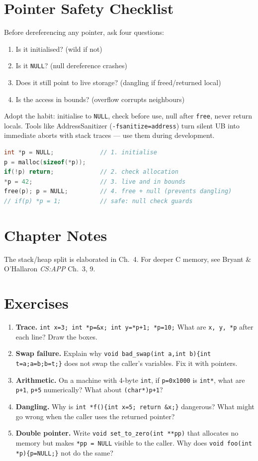 \section{Pointer Safety Checklist}
Before dereferencing any pointer, ask four questions:
\begin{enumerate}[leftmargin=*]
    \item Is it initialised? (wild if not)
    \item Is it \texttt{NULL}? (null dereference crashes)
    \item Does it still point to live storage? (dangling if freed/returned local)
    \item Is the access in bounds? (overflow corrupts neighbours)
\end{enumerate}
Adopt the habit: initialise to \texttt{NULL}, check before use, null after \texttt{free}, never return locals. Tools like AddressSanitizer (\texttt{-fsanitize=address}) turn silent UB into immediate aborts with stack traces --- use them during development.

\begin{lstlisting}[language=C]
int *p = NULL;             // 1. initialise
p = malloc(sizeof(*p));
if(!p) return;             // 2. check allocation
*p = 42;                   // 3. live and in bounds
free(p); p = NULL;         // 4. free + null (prevents dangling)
// if(p) *p = 1;           // safe: null check guards
\end{lstlisting}

\section{Chapter Notes}
The stack/heap split is elaborated in Ch.~4. For deeper C memory, see Bryant \& O'Hallaron \emph{CS:APP} Ch.~3, 9.

\section{Exercises}
\begin{enumerate}[label=E2.\arabic*, leftmargin=*, itemsep=0.6em]
\item \textbf{Trace.} \texttt{int x=3; int *p=\&x; int y=*p+1; *p=10;} What are \texttt{x, y, *p} after each line? Draw the boxes.
\item \textbf{Swap failure.} Explain why \texttt{void bad\_swap(int a,int b)\{int t=a;a=b;b=t;\}} does not swap the caller's variables. Fix it with pointers.
\item \textbf{Arithmetic.} On a machine with 4-byte \texttt{int}, if \texttt{p=0x1000} is \texttt{int*}, what are \texttt{p+1}, \texttt{p+5} numerically? What about \texttt{(char*)p+1}?
\item \textbf{Dangling.} Why is \texttt{int *f()\{int x=5; return \&x;\}} dangerous? What might go wrong when the caller uses the returned pointer?
\item \textbf{Double pointer.} Write \texttt{void set\_to\_zero(int **pp)} that allocates no memory but makes \texttt{*pp = NULL} visible to the caller. Why does \texttt{void foo(int *p)\{p=NULL;\}} not do the same?
\end{enumerate}
